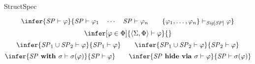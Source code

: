 \begin{entry}{StructSpec}  


\newcommand{\ang}[1]{\langle{#1}\rangle}
\newcommand{\Family}[2]{\ang{#1}_{#2}}
\newcommand{\SP}{\mathit{SP}}
\newcommand{\Sig}{\mathit{Sig}}
\newcommand{\SPSig}[1]{\Sig[#1]}
\newcommand{\INS}{{\bf INS}}
\newcommand{\Sign}{{\bf Sign}}
\newcommand{\Sen}{{\bf Sen}}
\newcommand{\Set}{{\bf Set}}
\newcommand{\Mod}{{\bf Mod}}
\newcommand{\Cat}{{\bf Cat}}
\newcommand{\op}{\mathit{op}}
\newcommand{\pow}{{\mathit{Pow}}}
\newcommand{\translate}[2]{#1\textbf{\upshape{} with }#2}
\newcommand{\derive}[2]{#1\textbf{\upshape{} hide via }#2}
\newcommand{\union}[2]{#1 \cup #2}

\begin{calculus}


\[
\infer{\SP \vdash \varphi}
      {\SP \vdash \varphi_1 \quad \cdots \quad \SP \vdash \varphi_n
         \qquad
         \{\varphi_1,\ldots,\varphi_n\} \vdash_{\SPSig{\SP}} \varphi}
\]
\[
\infer[\varphi \in \Phi]{\ang{\Sigma,\Phi} \vdash \varphi}
                        {}
\]
\[
\infer{\union{\SP_1}{\SP_2} \vdash \varphi}
      {\SP_1 \vdash \varphi}
\qquad
\infer{\union{\SP_1}{\SP_2} \vdash \varphi}
      {\SP_2 \vdash \varphi}
\]
\[
\infer{\translate{\SP}{\sigma} \vdash \sigma(\varphi)}
      {\SP \vdash \varphi}
\qquad
\infer{\derive{\SP}{\sigma} \vdash \varphi}
      {\SP \vdash \sigma(\varphi)}
\]

\end{calculus}


\end{entry}
